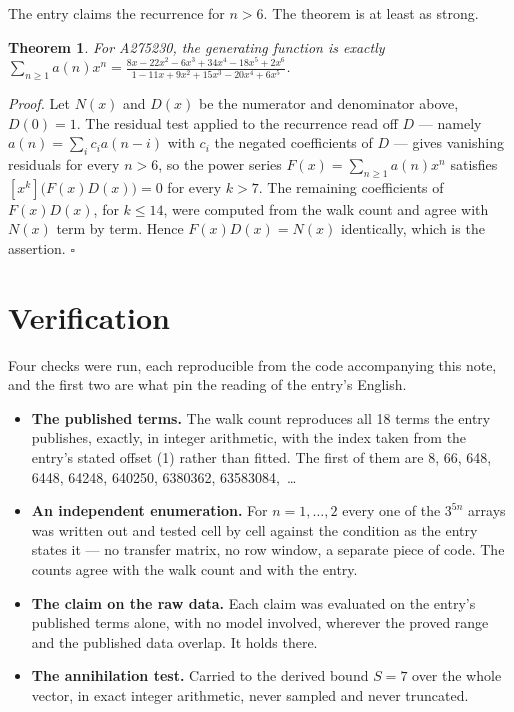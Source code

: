 \documentclass[11pt]{article}
\newtheorem{theorem}{Theorem}
\theoremstyle{definition}
\begin{document}
The entry claims the recurrence for $n > 6$. The theorem is at least as strong.

\begin{theorem} For A275230, the generating function is exactly $\sum_{n\ge 1} a(n)x^n = \frac{8x - 22x^{2} - 6x^{3} + 34x^{4} - 18x^{5} + 2x^{6}}{1 - 11x + 9x^{2} + 15x^{3} - 20x^{4} + 6x^{5}}$.\end{theorem}

{\itshape Proof.} Let $N(x)$ and $D(x)$ be the numerator and denominator above, $D(0)=1$. The residual test applied to the recurrence read off $D$ --- namely $a(n) = \sum_i c_i a(n-i)$ with $c_i$ the negated coefficients of $D$ --- gives vanishing residuals for every $n > 6$, so the power series $F(x)=\sum_{n\ge 1}a(n)x^n$ satisfies $[x^k]\bigl(F(x)D(x)\bigr) = 0$ for every $k > 7$. The remaining coefficients of $F(x)D(x)$, for $k \le 14$, were computed from the walk count and agree with $N(x)$ term by term. Hence $F(x)D(x) = N(x)$ identically, which is the assertion. $\square$

\section{Verification}

Four checks were run, each reproducible from the code accompanying this note, and the first two are what pin the reading of the entry's English.

\begin{itemize}

\item {\bfseries The published terms.} The walk count reproduces all 18 terms the entry publishes, exactly, in integer arithmetic, with the index taken from the entry's stated offset (1) rather than fitted. The first of them are 8, 66, 648, 6448, 64248, 640250, 6380362, 63583084,~\dots

\item {\bfseries An independent enumeration.} For $n = 1,\dots,2$ every one of the $3^{5n}$ arrays was written out and tested cell by cell against the condition as the entry states it --- no transfer matrix, no row window, a separate piece of code. The counts agree with the walk count and with the entry.

\item {\bfseries The claim on the raw data.} Each claim was evaluated on the entry's published terms alone, with no model involved, wherever the proved range and the published data overlap. It holds there.

\item {\bfseries The annihilation test.} Carried to the derived bound $S = 7$ over the whole vector, in exact integer arithmetic, never sampled and never truncated.

\end{itemize}
\end{document}

